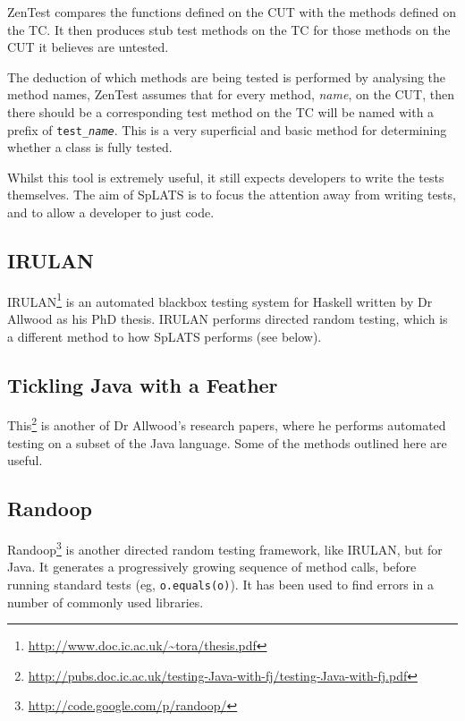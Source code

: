     ZenTest compares the functions defined on the CUT with the methods defined
on the TC. It then produces stub test methods on the TC for those methods on the
CUT it believes are untested.

    The deduction of which methods are being tested is performed by analysing
the method names, ZenTest assumes that for every method, \emph{name}, on the
CUT, then there should be a corresponding test method on the TC will be named
with a prefix of \texttt{test\_\emph{name}}. This is a very superficial and
basic method for determining whether a class is fully tested.

    Whilst this tool is extremely useful, it still expects developers to write
the tests themselves. The aim of SpLATS is to focus the attention away from
writing tests, and to allow a developer to just code.

  \subsection{IRULAN}
    IRULAN\footnote{\url{http://www.doc.ic.ac.uk/~tora/thesis.pdf}} is an automated blackbox testing system for Haskell written by Dr Allwood as his PhD thesis.
    IRULAN performs directed random testing, which is a different method to how SpLATS performs (see below).

  \subsection{Tickling Java with a Feather}
    This\footnote{\url{http://pubs.doc.ic.ac.uk/testing-Java-with-fj/testing-Java-with-fj.pdf}} is another of Dr Allwood's research papers, where he performs automated testing on a subset of the Java language.
    Some of the methods outlined here are useful.

  \subsection{Randoop}
    Randoop\footnote{\url{http://code.google.com/p/randoop/}} is another directed random testing framework, like IRULAN, but for Java.
    It generates a progressively growing sequence of method calls, before running standard tests (eg, \verb|o.equals(o)|).
    It has been used to find errors in a number of commonly used libraries.
